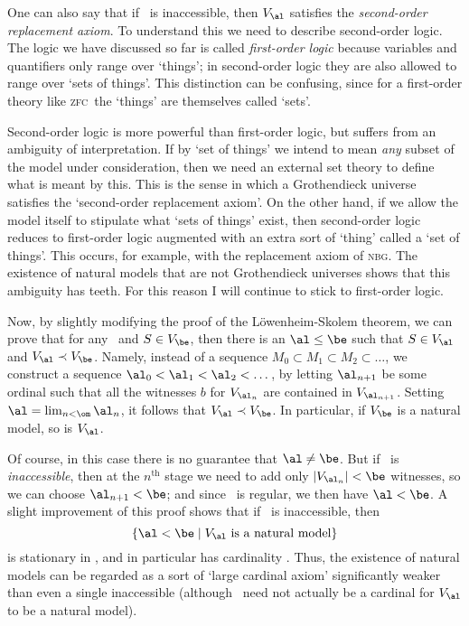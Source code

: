 \documentclass{amsart}
\let\ee\prec
\def\zfc{\textsc{zfc}}
\def\nbg{\textsc{nbg}}
\begin{document}
\begin{rmk}
  One can also say that if \al\ is inaccessible, then $V_\al$
  satisfies the \emph{second-order replacement axiom}.  To understand
  this we need to describe second-order logic.  The logic we have
  discussed so far is called \emph{first-order logic} because
  variables and quantifiers only range over `things'; in second-order
  logic they are also allowed to range over `sets of things'.  This
  distinction can be confusing, since for a first-order theory like
  \zfc\ the `things' are themselves called `sets'.

  Second-order logic is more powerful than first-order logic, but
  suffers from an ambiguity of interpretation.  If by `set of things'
  we intend to mean \emph{any} subset of the model under
  consideration, then we need an external set theory to define what is
  meant by this.  This is the sense in which a Grothendieck universe
  satisfies the `second-order replacement axiom'.  On the other hand,
  if we allow the model itself to stipulate what `sets of things'
  exist, then second-order logic reduces to first-order logic
  augmented with an extra sort of `thing' called a `set of things'.
  This occurs, for example, with the replacement axiom of \nbg.  The
  existence of natural models that are not Grothendieck universes
  shows that this ambiguity has teeth.  For this reason I will
  continue to stick to first-order logic.
\end{rmk}

Now, by slightly modifying the proof of the L\"owenheim-Skolem
theorem, we can prove that for any \be\ and $S\in V_\be$, then there
is an $\al\le \be$ such that $S\in V_\al$ and $V_\al\ee V_\be$.
Namely, instead of a sequence $M_0\subset M_1\subset M_2\subset\dots$,
we construct a sequence $\al_0<\al_1<\al_2<\dots$, by letting
$\al_{n+1}$ be some ordinal such that all the witnesses $b$ for
$V_{\al_n}$ are contained in $V_{\al_{n+1}}$.  Setting $\al =
\lim_{n<\om} \al_n$, it follows that $V_\al\ee V_\be$.  In particular,
if $V_\be$ is a natural model, so is $V_\al$.

Of course, in this case there is no guarantee that $\al\neq\be$.  But
if \be\ is \emph{inaccessible}, then at the $n^{\mathrm{th}}$ stage we
need to add only $|V_{\al_n}|<\be$ witnesses, so we can choose
$\al_{n+1}<\be$; and since \be\ is regular, we then have $\al<\be$.  A
slight improvement of this proof shows that if \be\ is inaccessible,
then
\[\{\al<\be \mid V_\al \text{ is a natural model}\}
\]
is stationary in \be, and in particular has cardinality \be.  Thus,
the existence of natural models can be regarded as a sort of `large
cardinal axiom' significantly weaker than even a single inaccessible
(although \al\ need not actually be a cardinal for $V_\al$ to be a
natural model).
\end{document}
